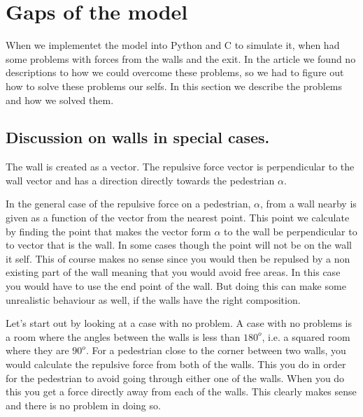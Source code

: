 \section{Gaps of the model}
\label{sec:gaps}
When we implementet the model into Python and C to simulate it, when had some problems with
forces from the walls and the exit. In the article we found no descriptions to how we could
overcome these problems, so we had to figure out how to solve these problems our selfs.
In this section we describe the problems and how we solved them.

\subsection{Discussion on walls in special cases.}\label{wallEndpoints}
The wall is created as a vector. The repulsive force vector is perpendicular to the wall 
vector and has a direction directly towards the pedestrian $\alpha$.

In the general case of the repulsive force on a pedestrian, $\alpha$, from a wall 
nearby is given as a function of the vector from the nearest point. This point we 
calculate by finding the point that makes the vector form $\alpha$ to the wall be 
perpendicular to to vector that is the wall. In some cases though the point will not 
be on the wall it self. This of course makes no sense since you would then be 
repulsed by a non existing part of the wall meaning that you would avoid free 
areas. In this case you would have to use the end point of the wall. But doing this 
can make some unrealistic behaviour as well, if the walls have the right composition. 

Let's start out by looking at a case with no problem. A case with no problems is a 
room where the angles between the walls is less than $180^o$, i.e. a squared room 
where they are $90^o$. For a pedestrian close to the corner between two walls, you 
would calculate the repulsive force from both of the walls. This you do in order 
for the pedestrian to avoid going through either one of the walls. When you do 
this you get a force directly away from each of the walls. This clearly makes 
sense and there is no problem in doing so.

